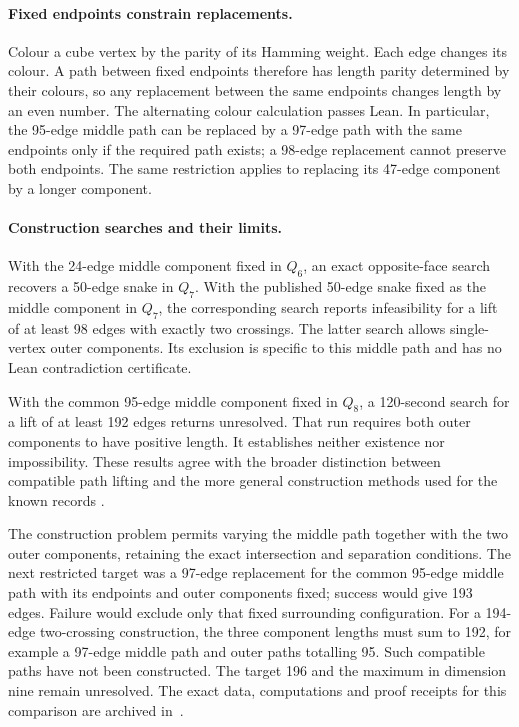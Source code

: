 \documentclass[11pt,a4paper]{article}
\theoremstyle{definition}
\theoremstyle{remark}
\begin{document}
\paragraph{Fixed endpoints constrain replacements.}
Colour a cube vertex by the parity of its Hamming weight. Each edge
changes its colour. A path between fixed endpoints therefore has
length parity determined by their colours, so any replacement between
the same endpoints changes length by an even number. The alternating
colour calculation passes Lean. In particular, the 95-edge middle
path can be replaced by a 97-edge path with the same endpoints only
if the required path exists; a 98-edge replacement cannot preserve
both endpoints. The same restriction applies to replacing its
47-edge component by a longer component.

\paragraph{Construction searches and their limits.}
With the 24-edge middle component fixed in $Q_6$, an exact opposite-face
search recovers a 50-edge snake in $Q_7$. With the published 50-edge
snake fixed as the middle component in $Q_7$, the corresponding search
reports infeasibility for a lift of at least 98 edges with exactly two
crossings. The latter search allows single-vertex outer components.
Its exclusion is specific to this middle path and has no Lean
contradiction certificate.

With the common 95-edge middle component fixed in $Q_8$, a 120-second
search for a lift of at least 192 edges returns unresolved. That run
requires both outer components to have positive length. It establishes
neither existence nor impossibility. These results agree with the
broader distinction between compatible path lifting \cite{taylor}
and the more general construction methods used for the known records
\cite{orland}.

The construction problem permits varying the middle path together with
the two outer components, retaining the exact intersection and
separation conditions. The next restricted target was a
97-edge replacement for the common 95-edge middle path with its
endpoints and outer components fixed; success would give 193 edges.
Failure would exclude only that fixed surrounding configuration.
For a 194-edge two-crossing construction, the three component lengths
must sum to 192, for example a 97-edge middle path and outer paths
totalling 95. Such compatible paths have not been constructed.
The target 196 and the maximum in dimension nine remain unresolved.
The exact data, computations and proof receipts for this comparison are
archived in~\cite{construction188archive}.
\end{document}
